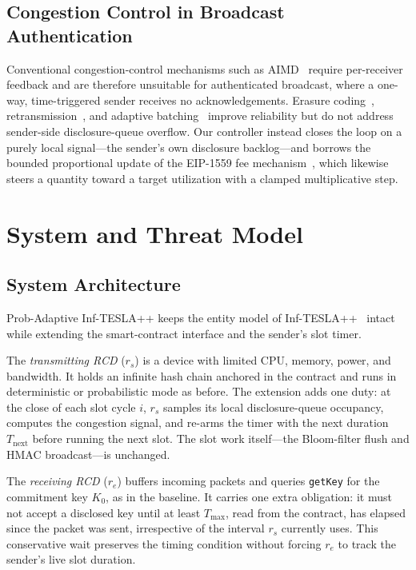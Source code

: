 \documentclass[conference]{IEEEtran}
\begin{document}
\subsection{Congestion Control in Broadcast Authentication}
Conventional congestion-control mechanisms such as AIMD~\cite{aimd} require
per-receiver feedback and are therefore unsuitable for authenticated broadcast,
where a one-way, time-triggered sender receives no acknowledgements. Erasure
coding~\cite{rabin}, retransmission~\cite{spins}, and adaptive
batching~\cite{inftesla} improve reliability but do not address sender-side
disclosure-queue overflow. Our controller instead closes the loop on a purely
local signal---the sender's own disclosure backlog---and borrows the bounded
proportional update of the EIP-1559 fee mechanism~\cite{eip1559}, which likewise
steers a quantity toward a target utilization with a clamped multiplicative step.

\section{System and Threat Model}

\subsection{System Architecture}
Prob-Adaptive Inf-TESLA++ keeps the entity model of Inf-TESLA++~\cite{inftesla}
intact while extending the smart-contract interface and the sender's slot timer.

The \emph{transmitting RCD} ($r_s$) is a device with limited CPU, memory, power,
and bandwidth. It holds an infinite hash chain anchored in the contract and runs
in deterministic or probabilistic mode as before. The extension adds one duty: at
the close of each slot cycle $i$, $r_s$ samples its local disclosure-queue
occupancy, computes the congestion signal, and re-arms the timer with the next
duration $T_{\mathrm{next}}$ before running the next slot. The slot work
itself---the Bloom-filter flush and HMAC broadcast---is unchanged.

The \emph{receiving RCD} ($r_e$) buffers incoming packets and queries
\texttt{getKey} for the commitment key $K_0$, as in the baseline. It carries one
extra obligation: it must not accept a disclosed key until at least $T_{\max}$,
read from the contract, has elapsed since the packet was sent, irrespective of
the interval $r_s$ currently uses. This conservative wait preserves the timing
condition without forcing $r_e$ to track the sender's live slot duration.
\end{document}
